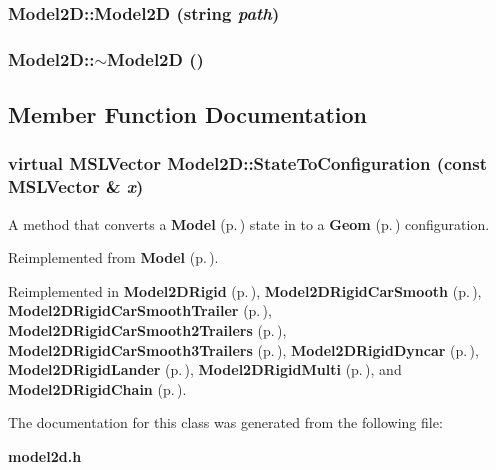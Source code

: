\subsubsection{\setlength{\rightskip}{0pt plus 5cm}Model2D::Model2D (string {\em path})}\label{class_Model2D_a0}


\subsubsection{\setlength{\rightskip}{0pt plus 5cm}Model2D::$\sim$Model2D ()\hspace{0.3cm}{\tt  [inline, virtual]}}\label{class_Model2D_a1}




\subsection{Member Function Documentation}
\subsubsection{\setlength{\rightskip}{0pt plus 5cm}virtual {\bf MSLVector} Model2D::State\-To\-Configuration (const {\bf MSLVector} \& {\em x})\hspace{0.3cm}{\tt  [virtual]}}\label{class_Model2D_a2}


A method that converts a {\bf Model} {\rm (p.\,\pageref{class_Model})} state in to a {\bf Geom} {\rm (p.\,\pageref{class_Geom})} configuration.



Reimplemented from {\bf Model} {\rm (p.\,\pageref{class_Model_a8})}.

Reimplemented in {\bf Model2DRigid} {\rm (p.\,\pageref{class_Model2DRigid_a6})}, {\bf Model2DRigid\-Car\-Smooth} {\rm (p.\,\pageref{class_Model2DRigidCarSmooth_a5})}, {\bf Model2DRigid\-Car\-Smooth\-Trailer} {\rm (p.\,\pageref{class_Model2DRigidCarSmoothTrailer_a4})}, {\bf Model2DRigid\-Car\-Smooth2Trailers} {\rm (p.\,\pageref{class_Model2DRigidCarSmooth2Trailers_a4})}, {\bf Model2DRigid\-Car\-Smooth3Trailers} {\rm (p.\,\pageref{class_Model2DRigidCarSmooth3Trailers_a4})}, {\bf Model2DRigid\-Dyncar} {\rm (p.\,\pageref{class_Model2DRigidDyncar_a3})}, {\bf Model2DRigid\-Lander} {\rm (p.\,\pageref{class_Model2DRigidLander_a3})}, {\bf Model2DRigid\-Multi} {\rm (p.\,\pageref{class_Model2DRigidMulti_a3})}, and {\bf Model2DRigid\-Chain} {\rm (p.\,\pageref{class_Model2DRigidChain_a2})}.

The documentation for this class was generated from the following file:\begin{CompactItemize}
\item 
{\bf model2d.h}\end{CompactItemize}
